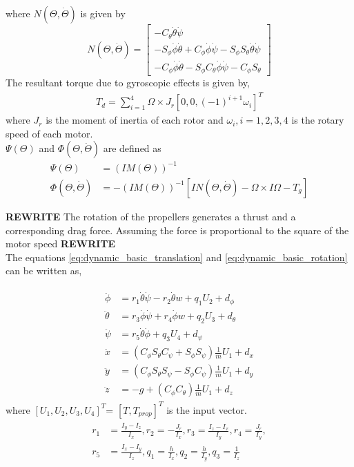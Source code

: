 \documentclass{article}
\begin{document}
where $N(\Theta,\dot{\Theta})$ is given by
\begin{equation*}
N(\Theta,\dot{\Theta})=
\left[\begin{array}{c}
-C_{\theta}\dot{\theta}\dot{\psi} \\
-S_{\phi}\dot{\phi}\dot{\theta}+C_{\phi}\dot{\phi}\dot{\psi} -S_{\phi}S_{\theta}\dot{\theta}\dot{\psi}\\
-C_{\phi}\dot{\phi}\dot{\theta}-S_{\phi}C_{\theta}\dot{\phi}\dot{\psi}-C_{\phi}S_{\theta}
\end{array}\right]
\end{equation*}
The resultant torque due to gyroscopic effects is given by, 
\begin{align}
T_d=\sum_{i=1}^{4}\Omega\times J_r[0,0,(-1)^{i+1}\omega_i]^T
\end{align}
where $J_r$ is the moment of inertia of each rotor and $\omega_i, i=1,2,3,4$ is the rotary speed of each motor.\\
$\Psi(\Theta)$ and $\Phi(\Theta,\dot{\Theta})$ are defined as
\begin{align*}
\Psi(\Theta)&=(IM(\Theta))^{-1}\\
\Phi(\Theta,\dot{\Theta})&=
-(IM(\Theta))^{-1}[IN(\Theta,\dot{\Theta}) -\Omega\times I\Omega-T_g]
\end{align*}

\textbf{REWRITE} The rotation of the propellers generates a thrust and a corresponding drag force. Assuming the force is proportional to the square of the motor speed \textbf{REWRITE}\\


The equations \eqref{eq:dynamic_basic_translation} and \eqref{eq:dynamic_basic_rotation} can be written as,

\begin{align}\label{eq2}
\begin{aligned}
\ddot{\phi}&=r_1\dot{\theta}\dot{\psi}-r_2\dot{\theta}w+q_1U_2+d_\phi\\
\ddot{\theta}&=r_3\dot{\phi}\dot{\psi}+r_4\dot{\phi}w+
q_2U_3+d_\theta\\
\ddot{\psi}&=r_5\dot{\theta}\dot{\phi}+q_3U_4+d_\psi\\
\ddot{x}&=(C_{\phi}S_{\theta}C_{\psi}+S_{\phi}S_{\psi})\frac{1}{m}U_1+d_x\\
\ddot{y}&=(C_{\phi}S_{\theta}S_{\psi}-S_{\phi}C_{\psi})\frac{1}{m}U_1+d_y\\
\ddot{z}&=-g+(C_{\phi}C_{\theta})\frac{1}{m}U_1+d_z
\end{aligned}
\end{align}
where $[U_{1},U_{2},U_{3},U_{4}]^{T}$= $[T, T_{prop}]^T$ is the input vector.
\begin{align*}
\begin{aligned}
r_{1}&=\frac{I_{y}-I_{z}}{I_{x}},
r_{2}=-\frac{J_{r}}{I_{x}},
r_{3}=\frac{I_{z}-I_{x}}{I_{y}},
r_{4}=\frac{J_{r}}{I_{y}},\\
r_{5}&=\frac{I_{x}-I_{y}}{I_{z}},
q_{1}=\frac{h}{I_{x}},
q_{2}=\frac{h}{I_{y}},
q_{3}=\frac{1}{I_{z}}
\end{aligned}
\end{align*}\\
\end{document}

